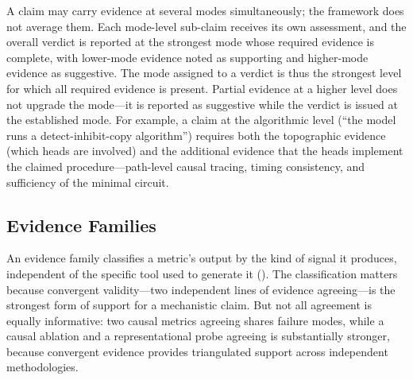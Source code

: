 \documentclass[10pt]{article}
\begin{document}
A claim may carry evidence at several modes simultaneously; the framework does not average them. Each mode-level sub-claim receives its own assessment, and the overall verdict is reported at the strongest mode whose required evidence is complete, with lower-mode evidence noted as supporting and higher-mode evidence as suggestive. The mode assigned to a verdict is thus the strongest level for which all required evidence is present. Partial evidence at a higher level does not upgrade the mode---it is reported as suggestive while the verdict is issued at the established mode. For example, a claim at the algorithmic level (``the model runs a detect-inhibit-copy algorithm'') requires both the topographic evidence (which heads are involved) and the additional evidence that the heads implement the claimed procedure---path-level causal tracing, timing consistency, and sufficiency of the minimal circuit.

\subsection{Evidence Families}
\label{sec:evidence-families}

An evidence family classifies a metric's output by the kind of signal it produces, independent of the specific tool used to generate it (). The classification matters because convergent validity---two independent lines of evidence agreeing---is the strongest form of support for a mechanistic claim. But not all agreement is equally informative: two causal metrics agreeing shares failure modes, while a causal ablation and a representational probe agreeing is substantially stronger, because convergent evidence provides triangulated support across independent methodologies.
\end{document}
